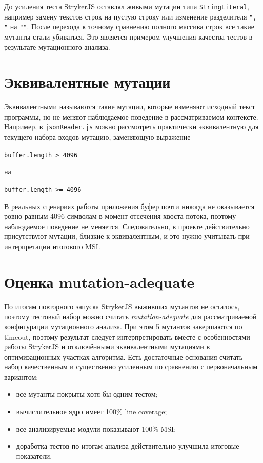 До усиления теста StrykerJS оставлял живыми мутации типа \texttt{StringLiteral}, например замену текстов строк на пустую строку или изменение разделителя \texttt{", "} на \texttt{""}.
После перехода к точному сравнению полного массива строк все такие мутанты стали убиваться.
Это является примером улучшения качества тестов в результате мутационного анализа.

\section{Эквивалентные мутации} \label{ch6:sec6}

Эквивалентными называются такие мутации, которые изменяют исходный текст программы, но не меняют наблюдаемое поведение в рассматриваемом контексте.
Например, в \texttt{jsonReader.js} можно рассмотреть практически эквивалентную для текущего набора входов мутацию, заменяющую выражение
\begin{center}
\texttt{buffer.length > 4096}
\end{center}
на
\begin{center}
\texttt{buffer.length >= 4096}
\end{center}

В реальных сценариях работы приложения буфер почти никогда не оказывается ровно равным 4096 символам в момент отсечения хвоста потока, поэтому наблюдаемое поведение не меняется.
Следовательно, в проекте действительно присутствуют мутации, близкие к эквивалентным, и это нужно учитывать при интерпретации итогового MSI.

\section{Оценка mutation-adequate} \label{ch6:sec7}

По итогам повторного запуска StrykerJS выживших мутантов не осталось, поэтому тестовый набор можно считать \textit{mutation-adequate} для рассматриваемой конфигурации мутационного анализа.
При этом 5 мутантов завершаются по timeout, поэтому результат следует интерпретировать вместе с особенностями работы StrykerJS и отключёнными эквивалентными мутациями в оптимизационных участках алгоритма.
Есть достаточные основания считать набор качественным и существенно усиленным по сравнению с первоначальным вариантом:
\begin{itemize}
    \item все мутанты покрыты хотя бы одним тестом;
    \item вычислительное ядро имеет 100\% line coverage;
    \item все анализируемые модули показывают 100\% MSI;
    \item доработка тестов по итогам анализа действительно улучшила итоговые показатели.
\end{itemize}


